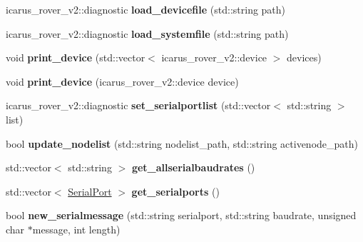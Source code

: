 \begin{DoxyCompactItemize}
icarus\+\_\+rover\+\_\+v2\+::diagnostic {\bfseries load\+\_\+devicefile} (std\+::string path)
\item 
\mbox{\label{classMasterNodeProcess_ab10aa76938a3f29137d304fef7262160}} 
icarus\+\_\+rover\+\_\+v2\+::diagnostic {\bfseries load\+\_\+systemfile} (std\+::string path)
\item 
\mbox{\label{classMasterNodeProcess_ae121ec70b76cf2157b83b502013b88c0}} 
void {\bfseries print\+\_\+device} (std\+::vector$<$ icarus\+\_\+rover\+\_\+v2\+::device $>$ devices)
\item 
\mbox{\label{classMasterNodeProcess_aded7463a46f27f9a9647749eed498721}} 
void {\bfseries print\+\_\+device} (icarus\+\_\+rover\+\_\+v2\+::device device)
\item 
\mbox{\label{classMasterNodeProcess_acbe48e54a38a292905dd3f934ad8ddad}} 
icarus\+\_\+rover\+\_\+v2\+::diagnostic {\bfseries set\+\_\+serialportlist} (std\+::vector$<$ std\+::string $>$ list)
\item 
\mbox{\label{classMasterNodeProcess_a61784e36f6fc3b65ea51c7e459c87500}} 
bool {\bfseries update\+\_\+nodelist} (std\+::string nodelist\+\_\+path, std\+::string activenode\+\_\+path)
\item 
\mbox{\label{classMasterNodeProcess_ad1376872d4db73283ea6a9a2c76c3a2a}} 
std\+::vector$<$ std\+::string $>$ {\bfseries get\+\_\+allserialbaudrates} ()
\item 
\mbox{\label{classMasterNodeProcess_abb82f5ffd60ac733e49e9a5cf9efbefd}} 
std\+::vector$<$ \hyperlink{structMasterNodeProcess_1_1SerialPort}{Serial\+Port} $>$ {\bfseries get\+\_\+serialports} ()
\item 
\mbox{\label{classMasterNodeProcess_a4d473aeb48e7fdaa06d6166dd272ce82}} 
bool {\bfseries new\+\_\+serialmessage} (std\+::string serialport, std\+::string baudrate, unsigned char $\ast$message, int length)
\item 
\mbox{\label{classMasterNodeProcess_a7f3f77ae75bbff286a83dc948602b1bc}} 

\end{DoxyCompactItemize}
